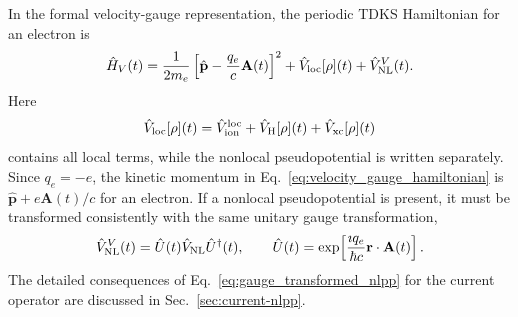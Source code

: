 In the formal velocity-gauge representation, the periodic TDKS
Hamiltonian for an electron is
\begin{equation}
  \hat H_V(t)
  =
  \frac{1}{2m_e}
  \left[
    \hat{\mathbf p}
    -
    \frac{q_e}{c}\mathbf A(t)
  \right]^2
  + \hat V_{\rm loc}[\rho](t)
  + \hat V_{\rm NL}^{V}(t).
  \label{eq:velocity_gauge_hamiltonian}
\end{equation}
Here
\begin{equation}
  \hat V_{\rm loc}[\rho](t)
  =
  \hat V_{\rm ion}^{\rm loc}
  + \hat V_{\rm H}[\rho](t)
  + \hat V_{\rm xc}[\rho](t)
  \label{eq:vloc_definition}
\end{equation}
contains all local terms, while the nonlocal pseudopotential is written
separately.  Since $q_e=-e$, the kinetic momentum in
Eq.~\eqref{eq:velocity_gauge_hamiltonian} is
$\hat{\mathbf p}+e\mathbf A(t)/c$ for an electron.  If a nonlocal
pseudopotential is present, it must be transformed consistently with the
same unitary gauge transformation,
\begin{equation}
  \hat V_{\rm NL}^{V}(t)
  =
  \hat U(t)\hat V_{\rm NL}\hat U^\dagger(t),
  \qquad
  \hat U(t)
  =
  \exp\!\left[
    \frac{\imath q_e}{\hbar c}
    \mathbf r\cdot\mathbf A(t)
  \right].
  \label{eq:gauge_transformed_nlpp}
\end{equation}
The detailed consequences of Eq.~\eqref{eq:gauge_transformed_nlpp} for
the current operator are discussed in Sec.~\ref{sec:current-nlpp}.

